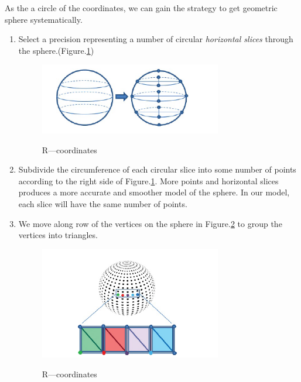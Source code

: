 \documentclass[12pt]{article}
\numberwithin{figure}{subsection}
\numberwithin{table}{subsection}
\numberwithin{equation}{subsection}
\begin{document}
As the a circle of the coordinates, we can gain the strategy to get geometric sphere systematically.
\begin{enumerate}
    \item  
    Select a precision representing a number of circular \emph{horizontal slices}
through the sphere.\newline(Figure.\ref{fig:sphere1}) 
    \begin{figure}[!htbp]
        \centering
        \includegraphics[width=0.75\textwidth]{image/sphere1.png}
        \caption{R—coordinates}
        \label{fig:sphere1}
        \cite{alma991002986248905076}
    \end{figure}
    \item 
    Subdivide the circumference of each circular slice into some number of
points according to the right side of Figure.\ref{fig:sphere1}. More points and horizontal slices
produces a more accurate and smoother model of the sphere. In our
model, each slice will have the same number of points.
    \item 
    We move along row of the vertices on the sphere in Figure.\ref{fig:sphere2} 
    to group the vertices into triangles. 
    \begin{figure}[!htbp]
        \centering
        \includegraphics[width=0.75\textwidth]{image/sphere2.png}
        \caption{R—coordinates}
        \label{fig:sphere2}
        \cite{alma991002986248905076}
    \end{figure}
\end{enumerate}
\end{document}
